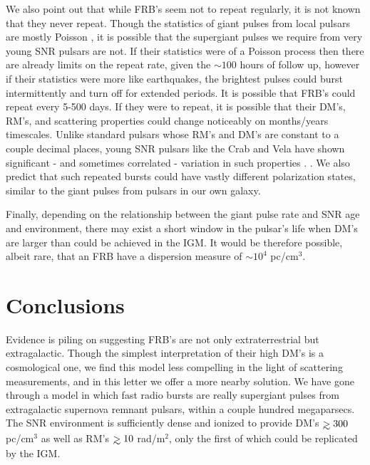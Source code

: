 \documentclass[useAMS,usenatbib]{mn2e}
\def\gtrsim{\mathrel{\hbox{\rlap{\hbox{\lower4pt\hbox{$\sim$}}}\hbox{$>$}}}}
\begin{document}
We also point out that while FRB's seem not to repeat regularly, 
it is not known that they never repeat. Though the statistics 
of giant pulses from local pulsars are mostly Poisson \citep{1999ApJ...517..460S},
it is possible that 
the supergiant pulses we require from very young SNR pulsars are not. If their 
statistics were of a Poisson process then there are already limits on the repeat rate, 
given the $\sim100$ hours of follow up, however if their statistics were more like
earthquakes, the brightest pulses could burst intermittently and turn off
for extended periods. It is possible that FRB's could repeat every 5-500 days. 
If they were to repeat,
it is possible that their DM's, RM's, and scattering properties could 
change noticeably on months/years timescales. Unlike standard pulsars 
whose RM's and DM's are constant to a couple decimal places, young 
SNR pulsars like the Crab and Vela have shown significant - and sometimes
correlated - variation in such properties \citep{1988A&A...202..166R, 2008A&A...483...13K}.
. We also predict that such repeated 
bursts could have vastly different polarization states, similar to the giant 
pulses from pulsars in our own galaxy.

Finally, depending on the relationship between the giant pulse rate and SNR
age and environment, there may exist a short window in the pulsar's life when 
DM's are larger than could be achieved in the IGM. It would be therefore 
possible, albeit rare, that an FRB have a dispersion
 measure of $\sim10^4$ pc/cm$^3$.


\section{Conclusions}
Evidence is piling on suggesting FRB's are not only extraterrestrial
but extragalactic. Though the simplest interpretation of their high DM's 
is a cosmological one, we find this model less compelling in the light of 
scattering measurements, and in this letter we offer a 
more nearby solution. 
We have gone through
a model in which fast radio bursts are really supergiant pulses from 
extragalactic supernova remnant pulsars, within a couple hundred megaparsecs. 
The SNR environment is sufficiently
dense and ionized to provide DM's $\gtrsim 300$pc/cm$^3$ as well as 
RM's $\gtrsim 10$ rad/m$^2$, only the first of which could be replicated by the IGM. 
\end{document}
